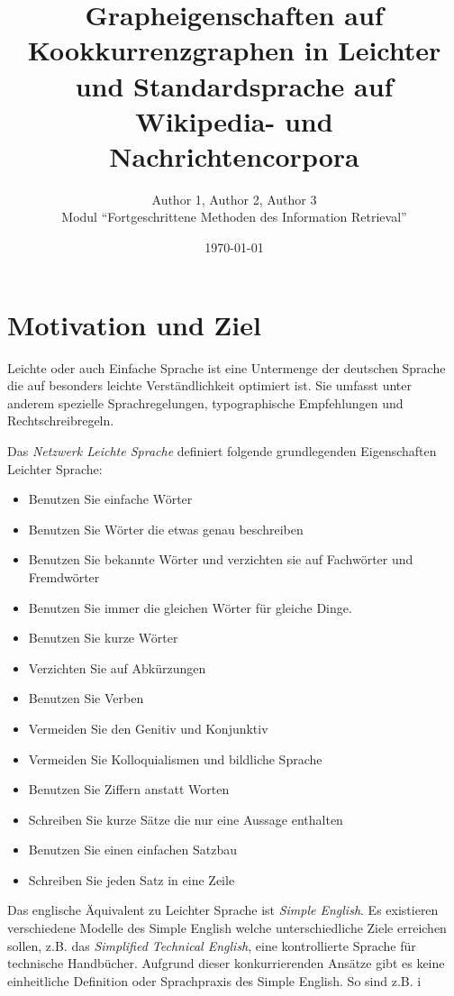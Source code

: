 \documentclass[12pt, a4paper]{article}
\title{Grapheigenschaften auf Kookkurrenzgraphen in Leichter und Standardsprache auf Wikipedia- und Nachrichtencorpora}
\author{Author 1, Author 2, Author 3\\Modul "`Fortgeschrittene Methoden des Information Retrieval"'}
\date{\today}
\begin{document}
\maketitle
\tableofcontents

\section{Motivation und Ziel}

Leichte oder auch Einfache Sprache ist eine Untermenge der deutschen Sprache
die auf besonders leichte Verst\"andlichkeit optimiert ist. Sie umfasst unter
anderem spezielle Sprachregelungen, typographische Empfehlungen und
Rechtschreibregeln. 

Das \emph{Netzwerk Leichte Sprache} definiert folgende grundlegenden
Eigenschaften Leichter Sprache:

\begin{itemize}
	\item Benutzen Sie einfache W\"orter
	\item Benutzen Sie W\"orter die etwas genau beschreiben
	\item Benutzen Sie bekannte W\"orter und verzichten sie auf Fachw\"orter und Fremdw\"orter
	\item Benutzen Sie immer die gleichen W\"orter f\"ur gleiche Dinge.
	\item Benutzen Sie kurze W\"orter
	\item Verzichten Sie auf Abk\"urzungen
	\item Benutzen Sie Verben
	\item Vermeiden Sie den Genitiv und Konjunktiv
	\item Vermeiden Sie Kolloquialismen und bildliche Sprache
	\item Benutzen Sie Ziffern anstatt Worten
	\item Schreiben Sie kurze S\"atze die nur eine Aussage enthalten
	\item Benutzen Sie einen einfachen Satzbau
	\item Schreiben Sie jeden Satz in eine Zeile
\end{itemize}

Das englische \"Aquivalent zu Leichter Sprache ist \emph{Simple English}. Es
existieren verschiedene Modelle des Simple English welche unterschiedliche
Ziele erreichen sollen, z.B. das \emph{Simplified Technical English}, eine
kontrollierte Sprache f\"ur technische Handb\"ucher. Aufgrund dieser
konkurrierenden Ans\"atze gibt es keine einheitliche Definition oder
Sprachpraxis des Simple English. So sind z.B. i
\end{document}
